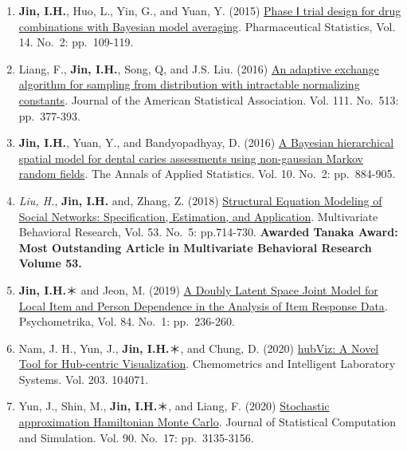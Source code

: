 \documentclass[
]{book}
\begin{document}
\begin{enumerate}
\item
  \textbf{Jin, I.H.}, Huo, L., Yin, G., and Yuan, Y. (2015) \href{https://pubmed.ncbi.nlm.nih.gov/25641851/}{Phase Ⅰ trial design for drug combinations with Bayesian model averaging}. Pharmaceutical Statistics, Vol. 14. No.~2: pp.~109-119.
\item
  Liang, F., \textbf{Jin, I.H.}, Song, Q, and J.S. Liu. (2016) \href{https://www.researchgate.net/publication/272376704_An_Adaptive_Exchange_Algorithm_for_Sampling_From_Distributions_With_Intractable_Normalizing_Constants}{An adaptive exchange algorithm for sampling from distribution with intractable normalizing constants}. Journal of the American Statistical Association. Vol. 111. No.~513: pp.~377-393.
\item
  \textbf{Jin, I.H.}, Yuan, Y., and Bandyopadhyay, D. (2016) \href{https://www.researchgate.net/publication/305627921_A_Bayesian_hierarchical_spatial_model_for_dental_caries_assessment_using_non-Gaussian_Markov_random_fields}{A Bayesian hierarchical spatial model for dental caries assessments using non-gaussian Markov random fields}. The Annals of Applied Statistics. Vol. 10. No.~2: pp.~884-905.
\item
  \emph{Liu, H.}, \textbf{Jin, I.H.} and, Zhang, Z. (2018) \href{https://www.researchgate.net/publication/329215082_Structural_Equation_Modeling_of_Social_Networks_Specification_Estimation_and_Application}{Structural Equation Modeling of Social Networks: Specification, Estimation, and Application}. Multivariate Behavioral Research, Vol. 53. No.~5: pp.714-730. \textbf{Awarded Tanaka Award: Most Outstanding Article in Multivariate Behavioral Research Volume 53.}
\item
  \textbf{Jin, I.H.}＊ and Jeon, M. (2019) \href{https://www.researchgate.net/publication/326276196_A_Doubly_Latent_Space_Joint_Model_for_Local_Item_and_Person_Dependence_in_the_Analysis_of_Item_Response_Data}{A Doubly Latent Space Joint Model for Local Item and Person Dependence in the Analysis of Item Response Data}. Psychometrika, Vol. 84. No.~1: pp.~236-260.
\item
  Nam, J. H., Yun, J., \textbf{Jin, I.H.}＊, and Chung, D. (2020) \href{https://www.researchgate.net/publication/341850019_hubViz_A_Novel_Tool_for_Hub-centric_Visualization}{hubViz: A Novel Tool for Hub-centric Visualization}. Chemometrics and Intelligent Laboratory Systems. Vol. 203. 104071.
\item
  Yun, J., Shin, M., \textbf{Jin, I.H.}＊, and Liang, F. (2020) \href{https://arxiv.org/abs/1810.04811}{Stochastic approximation Hamiltonian Monte Carlo}. Journal of Statistical Computation and Simulation. Vol. 90. No.~17: pp.~3135-3156.

\end{enumerate}
\end{document}
